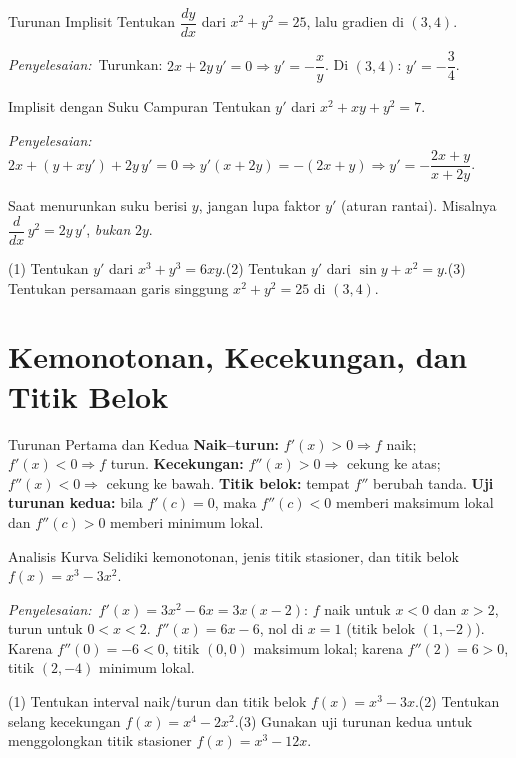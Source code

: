 \documentclass[11pt,a4paper]{report}
\theoremstyle{gaya}
\newcommand{\jawab}{\par\smallskip\noindent\textit{\textcolor{oranye}{Penyelesaian:}}\ }
\begin{document}
\begin{contoh}{Turunan Implisit}
Tentukan $\dfrac{dy}{dx}$ dari $x^2+y^2=25$, lalu gradien di $(3,4)$.

\jawab Turunkan: $2x+2y\,y'=0\Rightarrow y'=-\dfrac xy$. Di $(3,4)$: $y'=-\dfrac34$.
\end{contoh}

\begin{contoh}{Implisit dengan Suku Campuran}
Tentukan $y'$ dari $x^2+xy+y^2=7$.

\jawab $2x+(y+x y')+2y\,y'=0\Rightarrow y'(x+2y)=-(2x+y)\Rightarrow y'=-\dfrac{2x+y}{x+2y}$.
\end{contoh}

\begin{kesalahan}
Saat menurunkan suku berisi $y$, jangan lupa faktor $y'$ (aturan rantai). Misalnya $\dfrac{d}{dx}\,y^2=2y\,y'$, \emph{bukan} $2y$.
\end{kesalahan}

\begin{latihan}
(1) Tentukan $y'$ dari $x^3+y^3=6xy$.\quad (2) Tentukan $y'$ dari $\sin y+x^2=y$.\quad (3) Tentukan persamaan garis singgung $x^2+y^2=25$ di $(3,4)$.
\end{latihan}

\section{Kemonotonan, Kecekungan, dan Titik Belok}
\begin{konsep}{Turunan Pertama dan Kedua}
\textbf{Naik--turun:} $f'(x)>0\Rightarrow f$ naik; $f'(x)<0\Rightarrow f$ turun. \textbf{Kecekungan:} $f''(x)>0\Rightarrow$ cekung ke atas; $f''(x)<0\Rightarrow$ cekung ke bawah. \textbf{Titik belok:} tempat $f''$ berubah tanda. \textbf{Uji turunan kedua:} bila $f'(c)=0$, maka $f''(c)<0$ memberi maksimum lokal dan $f''(c)>0$ memberi minimum lokal.
\end{konsep}

\begin{contoh}{Analisis Kurva}
Selidiki kemonotonan, jenis titik stasioner, dan titik belok $f(x)=x^3-3x^2$.

\jawab $f'(x)=3x^2-6x=3x(x-2)$: $f$ naik untuk $x<0$ dan $x>2$, turun untuk $0<x<2$. $f''(x)=6x-6$, nol di $x=1$ (titik belok $(1,-2)$). Karena $f''(0)=-6<0$, titik $(0,0)$ maksimum lokal; karena $f''(2)=6>0$, titik $(2,-4)$ minimum lokal.
\end{contoh}

\begin{latihan}
(1) Tentukan interval naik/turun dan titik belok $f(x)=x^3-3x$.\quad (2) Tentukan selang kecekungan $f(x)=x^4-2x^2$.\quad (3) Gunakan uji turunan kedua untuk menggolongkan titik stasioner $f(x)=x^3-12x$.
\end{latihan}
\end{document}
